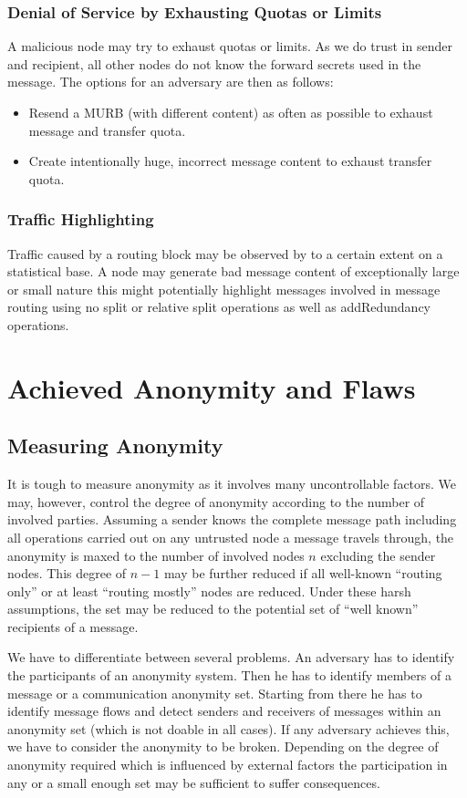 \subsubsection{Denial of Service by Exhausting Quotas or Limits}
A malicious node may try to exhaust quotas or limits. As we do trust in sender and recipient, all other nodes do not know the forward secrets used in the message. The options for an adversary are then as follows:

\begin{itemize}
	\item Resend a MURB (with different content) as often as possible to exhaust message and transfer quota.
	\item Create intentionally huge, incorrect message content to exhaust transfer quota.
\end{itemize}

\subsubsection{Traffic Highlighting}
Traffic caused by a routing block may be observed by to a certain extent on a statistical base. A node may generate bad message content of exceptionally large or small nature this might potentially highlight messages involved in message routing using no split or relative split operations as well as addRedundancy operations.

\section{Achieved Anonymity and Flaws}
\subsection{Measuring Anonymity}
It is tough to measure anonymity as it involves many uncontrollable factors. We may, however, control the degree of anonymity according to the number of involved parties. Assuming a sender knows the complete message path including all operations carried out on any untrusted node a message travels through, the anonymity is maxed to the number of involved nodes $n$ excluding the sender nodes. This degree of $n-1$ may be further reduced if all well-known ``routing only'' or at least ``routing mostly'' nodes are reduced. Under these harsh assumptions, the set may be reduced to the potential set of ``well known'' recipients of a message.

We have to differentiate between several problems. An adversary has to identify the participants of an anonymity system. Then he has to identify members of a message or a communication anonymity set. Starting from there he has to identify message flows and detect senders and receivers of messages within an anonymity set (which is not doable in all cases). If any adversary achieves this, we have to consider the anonymity to be broken. Depending on the degree of anonymity required which is influenced by external factors the participation in any or a small enough set may be sufficient to suffer consequences.


